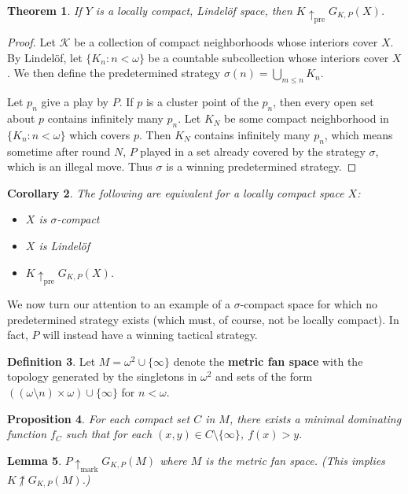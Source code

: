 \documentclass[11pt]{article}
\theoremstyle{plain}
\newtheorem{theorem}{Theorem}
\newtheorem{lemma}[theorem]{Lemma}
\newtheorem{corollary}[theorem]{Corollary}
\newtheorem{proposition}[theorem]{Proposition}
\theoremstyle{definition}
\newtheorem{definition}[theorem]{Definition}
\theoremstyle{remark}
\newcommand{\prewin}{\uparrow_{\text{pre}}}
\newcommand{\markwin}{\uparrow_{\text{mark}}}
\begin{document}
\begin{theorem}
If $Y$ is a locally compact, Lindel\"of space, then $K \prewin G_{K,P}(X)$.
\end{theorem}

\begin{proof}
Let $\mathcal{K}$ be a collection of compact neighborhoods whose interiors cover $X$. By Lindel\"of, let $\{K_n : n<\omega\}$ be a countable subcollection whose interiors cover $X$. We then define the predetermined strategy $\sigma(n)=\bigcup_{m\leq n} K_n$.

Let $p_n$ give a play by $P$. If $p$ is a cluster point of the $p_n$, then every open set about $p$ contains infinitely many $p_n$. Let $K_N$ be some compact neighborhood in $\{K_n : n<\omega\}$ which covers $p$. Then $K_N$ contains infinitely many $p_n$, which means sometime after round $N$, $P$ played in a set already covered by the strategy $\sigma$, which is an illegal move. Thus $\sigma$ is a winning predetermined strategy.
\end{proof}

\begin{corollary}
The following are equivalent for a locally compact space $X$:
    \begin{itemize}
    \item $X$ is $\sigma$-compact
    \item $X$ is Lindel\"of
    \item $K \prewin G_{K,P}(X)$.
    \end{itemize}
\end{corollary}

We now turn our attention to an example of a $\sigma$-compact space for which no predetermined strategy exists (which must, of course, not be locally compact). In fact, $P$ will instead have a winning tactical strategy.

\begin{definition}
Let $M=\omega^2\cup\{\infty\}$ denote the \textbf{metric fan space} with the topology generated by the singletons in $\omega^2$ and sets of the form $((\omega\setminus n)\times\omega) \cup \{\infty\}$ for $n<\omega$.
\end{definition}

\begin{proposition}
For each compact set $C$ in $M$, there exists a minimal dominating function $f_C$ such that for each $(x,y)\in C\setminus\{\infty\}$, $f(x)> y$.
\end{proposition}

\begin{lemma}
$P \markwin G_{K,P}(M)$ where $M$ is the metric fan space. (This implies $K\not\uparrow G_{K,P}(M)$.)
\end{lemma}
\end{document}
